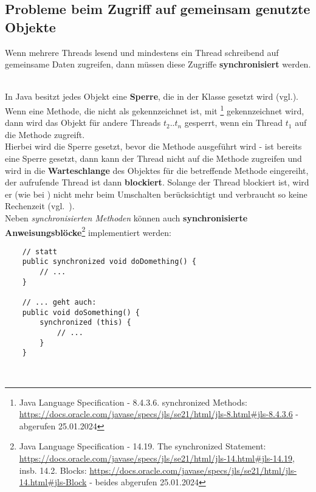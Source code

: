\subsection{Probleme beim Zugriff auf gemeinsam genutzte Objekte}\label{subsec:synchronizedstatement}

\begin{tcolorbox}
   Wenn mehrere Threads lesend und mindestens ein Thread schreibend auf gemeinsame Daten zugreifen, dann müssen diese Zugriffe \textbf{synchronisiert} werden.
\end{tcolorbox}\\

In Java besitzt jedes Objekt eine \textbf{Sperre}, die in der Klasse  gesetzt wird (vgl.\cite[26]{Oec22}).\\

\noindent
Wenn eine Methode, die nicht als  gekennzeichnet ist, mit \footnote{
    Java Language Specification - 8.4.3.6. synchronized Methods: \url{https://docs.oracle.com/javase/specs/jls/se21/html/jls-8.html#jls-8.4.3.6} - abgerufen 25.01.2024
} gekennzeichnet wird, dann wird das Objekt für andere Threads $t_2..t_n$ gesperrt, wenn ein Thread $t_1$ auf die Methode zugreift.\\
Hierbei wird die Sperre gesetzt, bevor die Methode ausgeführt wird - ist bereits eine Sperre gesetzt, dann kann der Thread nicht auf die Methode zugreifen und wird in die \textbf{Warteschlange} des Objektes für die betreffende Methode eingereiht, der aufrufende Thread ist dann \textbf{blockiert}.
Solange der Thread blockiert ist, wird er (wie bei ) nicht mehr beim Umschalten berücksichtigt und verbraucht so keine Rechenzeit (vgl.~\cite[26]{Oec22}).
\\

\noindent
Neben \textit{synchronisierten Methoden} können auch \textbf{synchronisierte Anweisungsblöcke}\footnote{
Java Language Specification - 14.19. The synchronized Statement: \url{https://docs.oracle.com/javase/specs/jls/se21/html/jls-14.html#jls-14.19}, insb. 14.2. Blocks: \url{https://docs.oracle.com/javase/specs/jls/se21/html/jls-14.html#jls-Block} - beides abgerufen 25.01.2024
} implementiert werden:\\

\begin{verbatim}
    // statt
    public synchronized void doDomething() {
        // ...
    }

    // ... geht auch:
    public void doSomething() {
        synchronized (this) {
            // ...
        }
    }
\end{verbatim}\\

